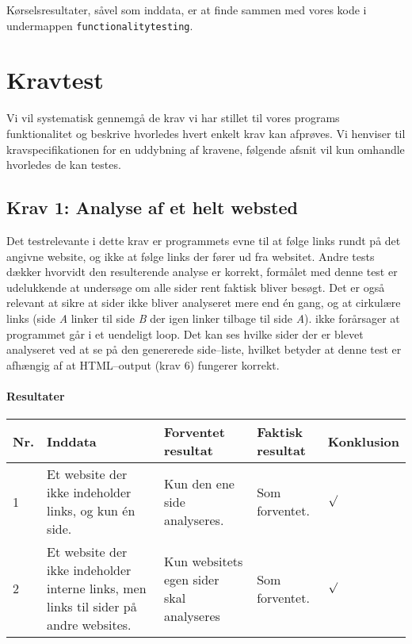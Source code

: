 \documentclass[a4paper,oneside,article]{memoir}
\begin{document}
Kørselsresultater, såvel som inddata, er at finde sammen med vores
kode i undermappen \texttt{functionalitytesting}.

\chapter{Kravtest}

Vi vil systematisk gennemgå de krav vi har stillet til vores programs
funktionalitet og beskrive hvorledes hvert enkelt krav kan
afprøves. Vi henviser til kravspecifikationen for en uddybning af
kravene, følgende afsnit vil kun omhandle hvorledes de kan testes.

\begin{landscape}
\section{Krav 1: Analyse af et helt websted}
Det testrelevante i dette krav er programmets evne til at følge links
rundt på det angivne website, og ikke at følge links der fører ud fra
websitet. Andre tests dækker hvorvidt den resulterende analyse er
korrekt, formålet med denne test er udelukkende at undersøge om alle
sider rent faktisk bliver besøgt. Det er også relevant at sikre at
sider ikke bliver analyseret mere end én gang, og at cirkulære links
(side \textit{A} linker til side \textit{B} der igen linker tilbage
til side \textit{A}). ikke forårsager at programmet går i et uendeligt
loop. Det kan ses hvilke sider der er blevet analyseret ved at se på
den genererede side--liste, hvilket betyder at denne test er afhængig
af at HTML--output (krav 6) fungerer korrekt.

\subsubsection{Resultater}
\begin{longtable}[c]{p{20pt}|p{220pt}|p{130pt}|p{130pt}|p{50pt}}
\textbf{Nr.} &
\textbf{Inddata} &
\textbf{Forventet resultat} &
\textbf{Faktisk resultat} &
\textbf{Konklusion} \\ \hline

1 &
Et website der ikke indeholder links, og kun én side. &
Kun den ene side analyseres. &
Som forventet. &
$\surd$ \\ \hline

2 &
Et website der ikke indeholder interne links, men links til
sider på andre websites. &
Kun websitets egen sider skal analyseres &
Som forventet. &
$\surd$ \\ \hline


\end{longtable}
\end{landscape}
\end{document}

